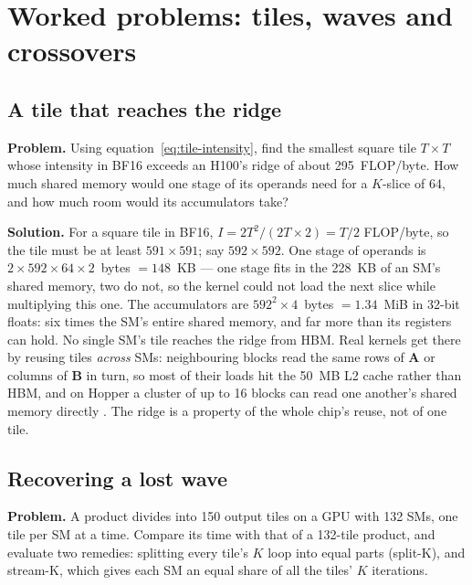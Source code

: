 \section{Worked problems: tiles, waves and crossovers}

\subsection{A tile that reaches the ridge}
\textbf{Problem.} Using equation~\eqref{eq:tile-intensity}, find the smallest
square tile $T \times T$ whose intensity in BF16 exceeds an H100's ridge of about
295~FLOP/byte. How much shared memory would one stage of its operands need for a
$K$-slice of 64, and how much room would its accumulators take?

\textbf{Solution.} For a square tile in BF16, $I = 2T^2/(2T \times 2) = T/2$
FLOP/byte, so the tile must be at least $591 \times 591$; say $592 \times 592$. One
stage of operands is $2 \times 592 \times 64 \times 2$~bytes $= 148$~KB --- one
stage fits in the 228~KB of an SM's shared memory, two do not, so the kernel could
not load the next slice while multiplying this one. The accumulators are
$592^2 \times 4$~bytes $= 1.34$~MiB in 32-bit floats: six times the SM's entire
shared memory, and far more than its registers can hold. No single SM's tile
reaches the ridge from HBM. Real kernels get there by reusing tiles \emph{across}
SMs: neighbouring blocks read the same rows of $\mathbf{A}$ or columns of
$\mathbf{B}$ in turn, so most of their loads hit the 50~MB L2 cache rather than
HBM, and on Hopper a cluster of up to 16 blocks can read one another's shared
memory directly \cite{nvidia2026hoppertuning}. The ridge is a property of the
whole chip's reuse, not of one tile.

\subsection{Recovering a lost wave}
\textbf{Problem.} A product divides into 150 output tiles on a GPU with 132 SMs,
one tile per SM at a time. Compare its time with that of a 132-tile product, and
evaluate two remedies: splitting every tile's $K$ loop into equal parts
(split-K), and stream-K, which gives each SM an equal share of all the tiles'
$K$ iterations.


